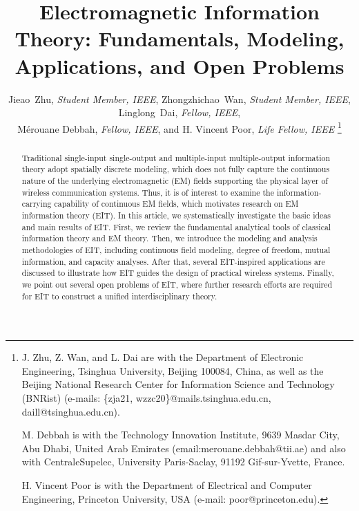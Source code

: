 \documentclass[journal,twocolumn]{IEEEtran}
\begin{document}
\title{Electromagnetic Information Theory: Fundamentals, Modeling, Applications, and Open Problems}

\author{{Jieao~Zhu, {\textit{Student Member, IEEE}}, Zhongzhichao~Wan, {\textit{Student Member, IEEE}}, Linglong~Dai, {\textit{Fellow, IEEE}},\\
M\'{e}rouane Debbah, {\textit{Fellow, IEEE}}, and H. Vincent Poor, {\textit{Life Fellow, IEEE}} }
\thanks{J. Zhu, Z. Wan, and L. Dai are with the Department of Electronic Engineering, Tsinghua University, Beijing 100084, China, as well as the Beijing National Research Center for Information Science and Technology (BNRist) (e-mails: \{zja21, wzzc20\}@mails.tsinghua.edu.cn, daill@tsinghua.edu.cn).

M. Debbah is with the Technology Innovation Institute, 9639 Masdar City, Abu Dhabi, United Arab Emirates (email:merouane.debbah@tii.ae) and also with CentraleSupelec, University Paris-Saclay, 91192 Gif-sur-Yvette, France. 

H. Vincent Poor is with the Department of Electrical and Computer Engineering, Princeton University, USA (e-mail: poor@princeton.edu).
}
}

\maketitle

\begin{abstract}
	Traditional single-input single-output and multiple-input multiple-output information theory adopt spatially discrete modeling, which does not fully capture the continuous nature of the underlying electromagnetic (EM) fields supporting the physical layer of wireless communication systems. %
 	Thus, it is of interest to examine the information-carrying capability of continuous EM fields, which motivates research on EM information theory (EIT). In this article, we systematically investigate the basic ideas and main results of EIT. First, we review the fundamental analytical tools of classical information theory and EM theory. Then, we introduce the modeling and analysis methodologies of EIT, including continuous field modeling, degree of freedom, mutual information, and capacity analyses. After that, several EIT-inspired applications are discussed to illustrate how EIT guides the design of practical wireless systems.  Finally, we point out several open problems of EIT, where further research efforts are required for EIT to construct a unified interdisciplinary theory.
\end{abstract}
\end{document}
